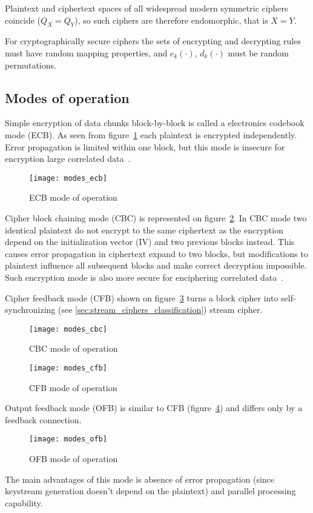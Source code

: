 Plaintext and ciphertext spaces of all widespread modern symmetric ciphers 
coincide ($Q_X = Q_Y$), so such ciphers are therefore endomorphic, that is 
\mbox{$X = Y$}.

For cryptographically secure ciphers the sets of encrypting and decrypting
rules must have random mapping properties, and $e_k(\cdot)$, $d_k(\cdot)$ must
be random permutations.


\subsection{Modes of operation}

Simple encryption of data chunks block-by-block is called a electronics
codebook mode (ECB). As seen from figure~\ref{fig:mode-ecb} each plaintext is
encrypted independently. Error propagation is limited within one block, but
this mode is insecure for encryption large correlated
data~\cite{menezes:applied_cryptography}.
\begin{figure}[htbp]
	\centering
	\texttt{[image: modes\_ecb]}
	\caption{ECB mode of operation}
	\label{fig:mode-ecb}
\end{figure}

Cipher block chaining mode (CBC) is represented on figure~\ref{fig:mode-cbc}.
In CBC mode two identical plaintext do not encrypt to the same ciphertext as
the encryption depend on the initialization vector (IV) and two previous blocks
instead. This causes error propagation in ciphertext expand to two blocks, but
modifications to plaintext influence all subsequent blocks and make correct
decryption impossible. Such encryption mode is also more secure for enciphering
correlated data~\cite{menezes:applied_cryptography}.

Cipher feedback mode (CFB) shown on figure~\ref{fig:mode-cfb} turns a block
cipher into self-synchronizing (see \ref{sec:stream_ciphers_classification})
stream cipher. 
\begin{figure}[htbp]
	\centering
	\texttt{[image: modes\_cbc]}
	\caption{CBC mode of operation}
	\label{fig:mode-cbc}
\end{figure}
\begin{figure}[htbp]
	\centering
	\texttt{[image: modes\_cfb]}
	\caption{CFB mode of operation}
	\label{fig:mode-cfb}
\end{figure}

Output feedback mode (OFB) is similar to CFB (figure~\ref{fig:mode-ofb}) and
differs only by a feedback connection.
\begin{figure}[htbp]
	\centering
	\texttt{[image: modes\_ofb]}
	\caption{OFB mode of operation}
	\label{fig:mode-ofb}
\end{figure}
The main advantages of this mode is
absence of error propagation (since keystream generation doesn't depend on the
plaintext) and parallel processing capability.

